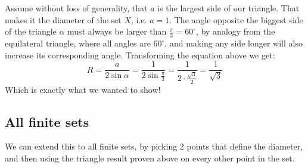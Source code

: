 \documentclass{article}
\begin{document}
  Assume without loss of generality, that $a$ is the largest side of our triangle.
  That makes it the diameter of the set $X$, i.e. $a = 1$.
  The angle opposite the biggest side of the triangle $\alpha$ must always be larger than $\frac{\pi}{3} = 60^\circ$,
  by analogy from the equilateral triangle, where all angles are $60^\circ$,
  and making any side longer will also increase its corresponding angle.
  Transforming the equation above we get:
  \[ R = \frac{a}{2\sin{\alpha}} = \frac{1}{2\sin{\frac{\pi}{3}}} = \frac{1}{2 \cdot \frac{\sqrt{3}}{2}} = \frac{1}{\sqrt{3}} \]
  Which is exactly what we wanted to show!

  \subsection{All finite sets}
  We can extend this to all finite sets, by picking 2 points that define the diameter,
  and then using the triangle result proven above on every other point in the set.

\end{document}
